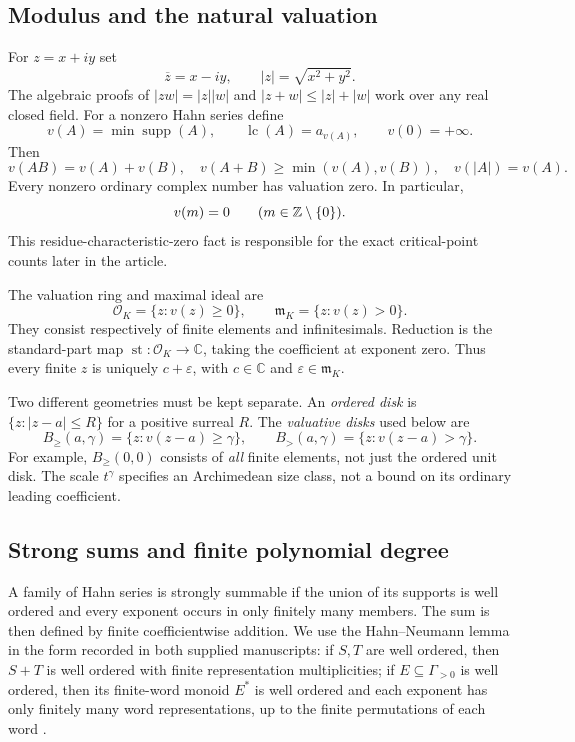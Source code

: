 \documentclass[11pt,letterpaper,oneside]{article}
\numberwithin{equation}{section}
\theoremstyle{definition}
\theoremstyle{remark}\newtheorem{remark}[theorem]{Remark}
\newcommand{\C}{\mathbb C}\newcommand{\R}{\mathbb R}\newcommand{\Q}{\mathbb Q}
\newcommand{\OO}{\mathcal O}\newcommand{\mm}{\mathfrak m}
\newcommand{\supp}{\operatorname{supp}}\newcommand{\st}{\operatorname{st}}
\newcommand{\lc}{\operatorname{lc}}\newcommand{\ord}{\operatorname{ord}}
\newcommand{\Bcl}{B_{\geq}}\newcommand{\Bop}{B_{>}}
\begin{document}
\subsection{Modulus and the natural valuation}
For $z=x+iy$ set
\[
 \overline z=x-iy,\qquad |z|=\sqrt{x^2+y^2}.
\]
The algebraic proofs of $|zw|=|z||w|$ and $|z+w|\leq|z|+|w|$ work over
any real closed field. For a nonzero Hahn series define
\[
 v(A)=\min\supp(A),\qquad \lc(A)=a_{v(A)},\qquad v(0)=+\infty.
\]
Then
\[
 v(AB)=v(A)+v(B),\quad
 v(A+B)\geq\min(v(A),v(B)),\quad v(|A|)=v(A).
\]
Every nonzero ordinary complex number has valuation zero. In particular,
\begin{equation}\label{eq:integersunit}
 v(m)=0\qquad(m\in\mathbb Z\setminus\{0\}).
\end{equation}
This residue-characteristic-zero fact is responsible for the exact
critical-point counts later in the article.

The valuation ring and maximal ideal are
\[
 \OO_K=\{z:v(z)\geq0\},\qquad \mm_K=\{z:v(z)>0\}.
\]
They consist respectively of finite elements and infinitesimals.
Reduction is the standard-part map
$\st:\OO_K\to\C$, taking the coefficient at exponent zero. Thus every
finite $z$ is uniquely $c+\varepsilon$, with $c\in\C$ and
$\varepsilon\in\mm_K$.

Two different geometries must be kept separate. An \emph{ordered disk} is
$\{z:|z-a|\leq R\}$ for a positive surreal $R$. The \emph{valuative disks}
used below are
\begin{equation}\label{eq:balls}
 \Bcl(a,\gamma)=\{z:v(z-a)\geq\gamma\},\qquad
 \Bop(a,\gamma)=\{z:v(z-a)>\gamma\}.
\end{equation}
For example, $\Bcl(0,0)$ consists of \emph{all} finite elements, not just
the ordered unit disk. The scale $t^\gamma$ specifies an Archimedean size
class, not a bound on its ordinary leading coefficient.

\subsection{Strong sums and finite polynomial degree}
A family of Hahn series is strongly summable if the union of its supports
is well ordered and every exponent occurs in only finitely many members.
The sum is then defined by finite coefficientwise addition. We use the
Hahn--Neumann lemma in the form recorded in both supplied manuscripts:
if $S,T$ are well ordered, then $S+T$ is well ordered with finite
representation multiplicities; if $E\subseteq\Gamma_{>0}$ is well ordered,
then its finite-word monoid $E^*$ is well ordered and each exponent has
only finitely many word representations, up to the finite permutations
of each word \cite{Poonen,SourceAnalysis}.
\end{document}
